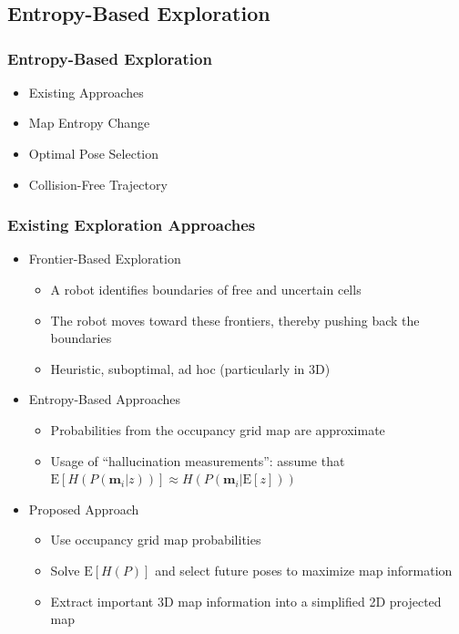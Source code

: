 \documentclass[11pt,professionalfonts,hyperref={pdftex,pdfpagemode=none,pdfstartview=FitH}]{beamer}
\begin{document}
\section*{}
\subsection*{Entropy-Based Exploration}

\begin{frame}
\frametitle{Entropy-Based Exploration}
\begin{itemize}
	\item Existing Approaches
	\vspace*{1cm}
	\item Map Entropy Change
	\vspace*{1cm}
	\item Optimal Pose Selection
	\vspace*{1cm}
	\item Collision-Free Trajectory
\end{itemize}

\end{frame}

\begin{frame}
\frametitle{Existing Exploration Approaches}

\begin{itemize}
	\item Frontier-Based Exploration
	\begin{itemize}
		\item A robot identifies boundaries of free and uncertain cells
		\item The robot moves toward these frontiers, thereby pushing back the boundaries
		\item Heuristic, suboptimal, ad hoc (particularly in 3D)
	\end{itemize}
	\vspace*{0.0cm}\pause
	\item Entropy-Based Approaches
	\begin{itemize}
		\item Probabilities from the occupancy grid map are approximate
		\item Usage of ``hallucination measurements'': assume that $\text{E}[H(P(\mathbf{m}_i|z))]\approx H(P(\mathbf{m}_i|\text{E}[z]))$
	\end{itemize}
	\vspace*{0.0cm}\pause
	\item Proposed Approach
	\begin{itemize}
		\item Use occupancy grid map probabilities
		\item Solve $\text{E}[H(P)]$ and select future poses to maximize map information
		\item Extract important 3D map information into a simplified 2D projected map
	\end{itemize}
\end{itemize}
\end{frame}
\end{document}
